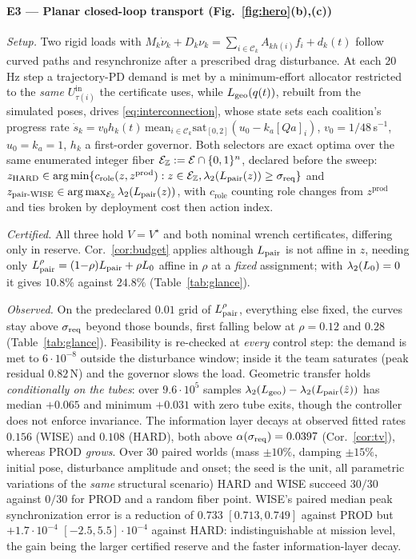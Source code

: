 \paragraph*{E3 --- Planar closed-loop transport (Fig.~\ref{fig:hero}(b),(c))}
\emph{Setup.} Two rigid loads with $M_k\dot\nu_k+D_k\nu_k=\sum_{i\in\mathcal C_k}A_{kh(i)}f_i
+d_k(t)$ follow curved paths and resynchronize after a prescribed drag disturbance. At each
$20$\,Hz step a trajectory-PD demand is met by a minimum-effort allocator restricted to the
\emph{same} $U_{\tau(i)}^{\mathrm{in}}$ the certificate uses, while
$L_{\mathrm{geo}}(q(t))$, rebuilt from the simulated poses, drives \eqref{eq:interconnection}, whose
state sets each coalition's progress rate $\dot s_k=v_0h_k(t)\,\mathrm{mean}_{i\in\mathcal C_k}
\mathrm{sat}_{[0,2]}(u_0-k_a[Qa]_i)$, $v_0=1/48$\,s$^{-1}$, $u_0=k_a=1$, $h_k$ a first-order
governor. Both selectors are exact optima over the same enumerated integer fiber
$\mathcal{E}_{\mathbb Z}:=\mathcal{E}\cap\{0,1\}^n$, declared before the sweep:
$z_{\mathrm{HARD}}\in\arg\min\{c_{\mathrm{role}}(z,z^{\mathrm{prod}}):z\in\mathcal{E}_{\mathbb Z},
\lambda_2(L_{\mathrm{pair}}(z))\ge\sigma_{\mathrm{req}}\}$ and
$z_{\text{pair-WISE}}\in\arg\max_{\mathcal{E}_{\mathbb Z}}\lambda_2(L_{\mathrm{pair}}(z))$, with
$c_{\mathrm{role}}$ counting role changes from $z^{\mathrm{prod}}$ and ties broken by
deployment cost then action index.

\emph{Certified.} All three hold $V=V^{\star}$ and both nominal wrench certificates, differing
only in reserve. Cor.~\ref{cor:budget} applies although $L_{\mathrm{pair}}$ is not affine in $z$, needing
only $L_{\mathrm{pair}}^{\rho}=(1{-}\rho)L_{\mathrm{pair}}+\rho L_0$ affine in $\rho$ at a \emph{fixed} assignment;
with $\lambda_2(L_0)=0$ it gives $10.8\%$ against $24.8\%$ (Table~\ref{tab:glance}).

\emph{Observed.} On the predeclared $0.01$ grid of $L_{\mathrm{pair}}^{\rho}$, everything else fixed, the
curves stay above $\sigma_{\mathrm{req}}$ beyond those bounds, first falling below at $\rho=0.12$ and
$0.28$ (Table~\ref{tab:glance}). Feasibility is re-checked at \emph{every} control step: the demand is met to $6\cdot10^{-8}$
outside the disturbance window; inside it the team saturates (peak residual $0.82$\,N) and the
governor slows the load. Geometric transfer holds
\emph{conditionally on the tubes}: over $9.6\cdot10^{5}$ samples
$\lambda_2(L_{\mathrm{geo}})-\lambda_2(L_{\mathrm{pair}}(\hat z))$ has median $+0.065$ and minimum $+0.031$ with zero
tube exits, though the controller does not enforce invariance. The information layer decays at observed fitted rates $0.156$ (WISE) and $0.108$ (HARD),
both above $\alpha(\sigma_{\mathrm{req}})=0.0397$ (Cor.~\ref{cor:tv}), whereas PROD \emph{grows}. Over $30$ paired worlds (mass $\pm10\%$, damping $\pm15\%$, initial pose, disturbance
amplitude and onset; the seed is the unit, all parametric variations of the \emph{same}
structural scenario) HARD and WISE succeed $30/30$ against $0/30$ for PROD and a random fiber
point. WISE's paired median peak synchronization error is a reduction of $0.733$
$[0.713,0.749]$ against PROD but $+1.7\cdot10^{-4}$ $[-2.5,5.5]\cdot10^{-4}$ against HARD:
indistinguishable at mission level, the gain being the larger certified reserve and the faster
information-layer decay.

